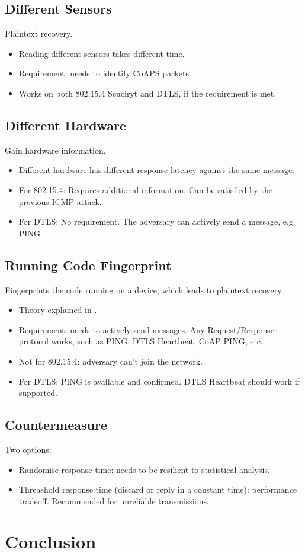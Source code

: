 \documentclass{article}
\begin{document}
\subsection{Different Sensors}
Plaintext recovery.
\begin{itemize}
	\item Reading different sensors takes different time.
	\item Requirement: needs to identify CoAPS packets.
	\item Works on both 802.15.4 Seuciryt and DTLS, if the requirement is met. 
\end{itemize}

\subsection{Different Hardware}
Gain hardware information.
\begin{itemize}
	\item Different hardware has different response latency against the same message.
	\item For 802.15.4: Requires additional information. Can be satisfied by the previous ICMP attack.
	\item For DTLS: No requirement. The adversary can actively send a message, e.g. PING.
\end{itemize}

\subsection{Running Code Fingerprint}
Fingerprints the code running on a device, which leads to plaintext recovery.
\begin{itemize}
	\item Theory explained in .
	\item Requirement: needs to actively send messages. Any Request/Response protocol works, such as PING, DTLS Heartbeat, CoAP PING, etc. 
	\item Not for 802.15.4: adversary can't join the network.
	\item For DTLS: PING is available and confirmed. DTLS Heartbeat should work if supported.
\end{itemize}


\subsection{Countermeasure}
Two options:
\begin{itemize}
	\item Randomise response time: needs to be resilient to statistical analysis.
	\item Threashold response time (discard or reply in a constant time): performance tradeoff. Recommended for unreliable transmissions.
\end{itemize}

\section{Conclusion}




\end{document}
